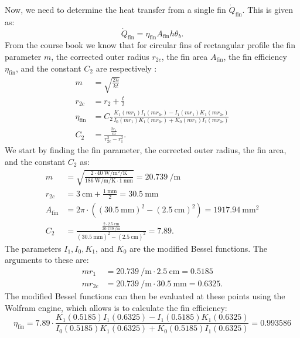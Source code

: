 \begin{derivation}
  Now, we need to determine the heat transfer from a single fin $\dot{Q}_{\text{fin}}$.
  This is given as:
  \begin{equation*}
    \dot{Q}_{\text{fin}} = \eta_{\text{fin}} A_{\text{fin}} h \theta_b
  .\end{equation*}
  From the course book we know that for circular fins of rectangular profile the fin parameter $m$, the corrected outer radius $r_{2c}$, the fin area $A_{\text{fin}}$, the fin efficiency $\eta_{\text{fin}}$, and the constant $C_2$ are respectively :
  \begin{align*}
    m &= \sqrt{\frac{2h}{kt}} \\
    r_{2c} &= r_2 + \frac{t}{2} \\
    \eta_{\text{fin}} &= C_2 \frac{K_1 (m r_1) I_1 (mr_{2c}) - I_1 (mr_1) K_1(mr_{2c})}{I_0 (mr_{1}) K_1(mr_{2c}) + K_0 (mr_1) I_1 (mr_{2c})} \\
    C_2 &= \frac{\frac{2r_1}{m}}{r^2_{2c} - r_1^2}
  .\end{align*}
  We start by finding the fin parameter, the corrected outer radius, the fin area, and the constant $C_2$ as:
  \begin{align*}
    m &= \sqrt{\frac{2 \cdot \qty{40}{\W\per\m\squared\per\K}}{\qty{186}{\W\per\m\per\K} \cdot \qty{1}{\mm} }} = \qty{20.739}{\per\m} \\
    r_{2c} &= \qty{3}{\cm} + \frac{\qty{1}{\mm} }{2}  = \qty{30.5}{\mm}\\
    A_{\text{fin}} &= 2\pi \cdot \left( (\qty{30,5}{\mm} )^2 - \left( \qty{2,5}{\cm} \right)^2 \right) = \qty{1917.94}{\mm^2}\\
    C_2 &= \frac{\frac{2 \cdot \qty{2,5}{\cm}}{\qty{20,739}{\per\m}}}{(\qty{30,5}{\mm})^2 - (\qty{2,5}{\cm})^2} = \num{7,89} 
  .\end{align*}
  The parameters $I_1, I_0, K_1$, and $K_0$ are the modified Bessel functions. The arguments to these are:
  \begin{align*}
    mr_1 &= \qty{20,739}{\per\m} \cdot \qty{2,5}{\cm} = \num{0,5185}  \\
    m r_{2c} &= \qty{20,739}{\per\m} \cdot \qty{30,5}{\mm} = \num{0,6325}
  .\end{align*}
  The modified Bessel functions can then be evaluated at these points using the Wolfram engine, which allows is to calculate the fin efficiency:
  \begin{equation*}
    \eta_{\text{fin}} = \num{7,89} \cdot \frac{K_1(\num{0,5185}) I_1(\num{0,6325}) - I_1(\num{0,5185}) K_1(\num{0,6325})}{I_0(\num{0,5185}) K_1(\num{0,6325}) + K_0(\num{0,5185}) I_1(\num{0,6325})} = \num{0.993586}

\end{equation*}
\end{derivation}
